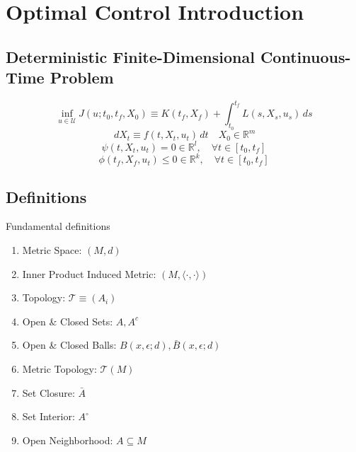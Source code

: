 \section{Optimal Control Introduction}

\subsection{Deterministic Finite-Dimensional Continuous-Time Problem}

\begin{equation}
    \inf_{u\in\mathcal{U}} J(u;t_0,t_f,X_0) \equiv K(t_f,X_f) + \int_{t_0}^{t_f} L(s,X_s,u_s)\,ds
\end{equation}
\begin{equation}
    \,dX_t \equiv f(t,X_t, u_t)\,dt\quad X_0 \in \mathbb{R}^m
\end{equation}
\begin{equation}
    \psi(t,X_t,u_t) = 0 \in \mathbb{R}^l,\quad \forall t \in [t_0,t_f]
\end{equation}
\begin{equation}
    \phi(t_f,X_f,u_t) \le 0 \in \mathbb{R}^k, \quad \forall t \in [t_0,t_f]
\end{equation}

\subsection{Definitions}

\begin{summary}

    Fundamental definitions
    \begin{enumerate}
        \item Metric Space: $(M,d)$
        \item Inner Product Induced Metric: $(M, \langle \cdot, \cdot \rangle)$
        \item Topology: $\mathcal{T} \equiv (A_i)$
        \item Open \& Closed Sets: $A, A^c$
        \item Open \& Closed Balls: $B(x,\epsilon;d), \bar{B}(x,\epsilon;d)$
        \item Metric Topology: $\mathcal{T}(M)$
        \item Set Closure: $\bar{A}$
        \item Set Interior: $A^\circ$
        \item Open Neighborhood: $A\subseteq M$
    \end{enumerate}
\end{summary}

